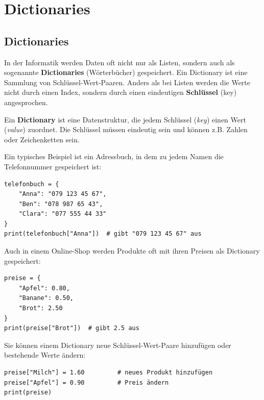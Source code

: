 \section{Dictionaries}
\subsection{Dictionaries}
In der Informatik werden Daten oft nicht nur als Listen, sondern auch als sogenannte \textbf{Dictionaries} (Wörterbücher) gespeichert. Ein Dictionary ist eine Sammlung von Schlüssel-Wert-Paaren. Anders als bei Listen werden die Werte nicht durch einen Index, sondern durch einen eindeutigen \textbf{Schlüssel} (key) angesprochen.

\begin{mydefinition}
Ein \textbf{Dictionary} ist eine Datenstruktur, die jedem Schlüssel (\textit{key}) einen Wert (\textit{value}) zuordnet. Die Schlüssel müssen eindeutig sein und können z.B. Zahlen oder Zeichenketten sein.
\end{mydefinition}

\begin{myexample}
Ein typisches Beispiel ist ein Adressbuch, in dem zu jedem Namen die Telefonnummer gespeichert ist:
\begin{lstlisting}
telefonbuch = {
    "Anna": "079 123 45 67",
    "Ben": "078 987 65 43",
    "Clara": "077 555 44 33"
}
print(telefonbuch["Anna"])  # gibt "079 123 45 67" aus
\end{lstlisting}
\end{myexample}

\begin{myexample}
Auch in einem Online-Shop werden Produkte oft mit ihren Preisen als Dictionary gespeichert:
\begin{lstlisting}
preise = {
    "Apfel": 0.80,
    "Banane": 0.50,
    "Brot": 2.50
}
print(preise["Brot"])  # gibt 2.5 aus
\end{lstlisting}
\end{myexample}

\begin{myexample}
Sie können einem Dictionary neue Schlüssel-Wert-Paare hinzufügen oder bestehende Werte ändern:
\begin{lstlisting}
preise["Milch"] = 1.60         # neues Produkt hinzufügen
preise["Apfel"] = 0.90         # Preis ändern
print(preise)
\end{lstlisting}
\end{myexample}

